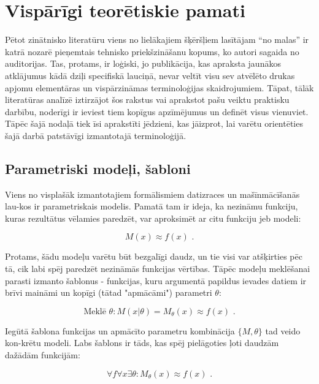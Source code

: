 \documentclass[12pt, a4paper]{article}
\numberwithin{equation}{section} %
\begin{document}
\newpage
\section{Vispārīgi teorētiskie pamati}

Pētot zinātnisko literatūru viens no lielākajiem šķēršļiem lasītājam ``no malas'' ir katrā nozarē pieņemtais tehnisko priekšzināšanu kopums, ko autori sagaida no auditorijas. Tas, protams, ir loģiski, jo publikācija, kas apraksta jaunākos atklājumus kādā dziļi specifiskā lauciņā, nevar veltīt visu sev atvēlēto drukas apjomu elementāras un vispārzināmas terminoloģijas skaidrojumiem. Tāpat, tālāk literatūras analīzē iztirzājot šos rakstus vai aprakstot pašu veiktu praktisku darbību, noderīgi ir ieviest tiem kopīgus apzīmējumus un definēt visus vienuviet. Tāpēc šajā nodaļā tiek īsi aprakstīti jēdzieni, kas jāizprot, lai varētu orientēties šajā darbā patstāvīgi izmantotajā terminoloģijā.

\subsection{Parametriski modeļi, šabloni}

Viens no visplašāk izmantotajiem formālismiem datizraces un mašīnmācīšanās lau-kos ir parametriskais modelis. Pamatā tam ir ideja, ka nezināmu funkciju, kuras rezultātus vēlamies paredzēt, var aproksimēt ar citu funkciju jeb modeli:

\begin{equation} 
    M(x) \approx f(x)
\text{ .}
\end{equation}

Protams, šādu modeļu varētu būt bezgalīgi daudz, un tie visi var atšķirties pēc tā, cik labi spēj paredzēt nezināmās funkcijas vērtības. Tāpēc modeļu meklēšanai parasti izmanto šablonus - funkcijas, kuru argumentā papildus ievades datiem ir brīvi maināmi un kopīgi (tātad "apmācāmi") parametri $\theta$:

\begin{equation} 
    \text{Meklē } \theta:M(x \vert \theta) = M_{\theta}(x)  \approx f(x)
\text{ .}
\end{equation}

Iegūtā šablona funkcijas un apmācīto parametru kombinācija $\lbrace M, \theta \rbrace$ tad veido kon-krētu modeli. Labs šablons ir tāds, kas spēj pielāgoties ļoti daudzām dažādām funkcijām:

\begin{equation} 
    \forall f \forall x \exists \theta:M_{\theta}(x)\approx f(x)
\text{ .}
\end{equation}
\end{document}
